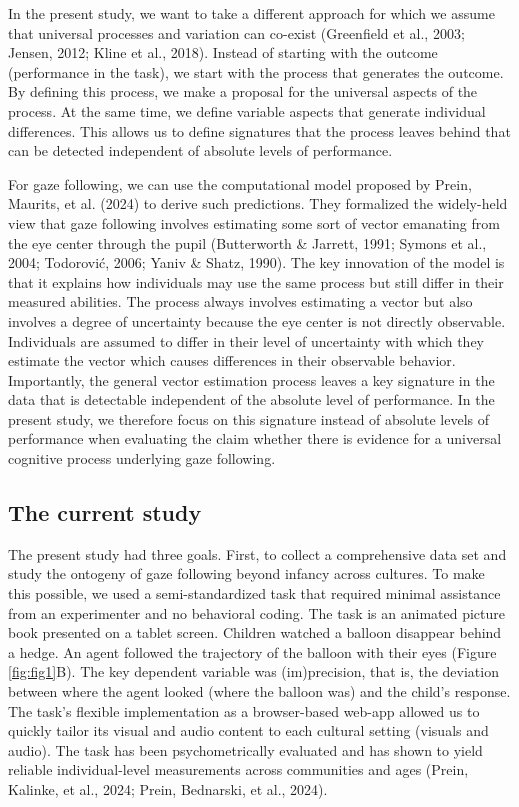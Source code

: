 \documentclass[
  man,floatsintext]{apa7}
\begin{document}
In the present study, we want to take a different approach for which we assume that universal processes and variation can co-exist (Greenfield et al., 2003; Jensen, 2012; Kline et al., 2018). Instead of starting with the outcome (performance in the task), we start with the process that generates the outcome. By defining this process, we make a proposal for the universal aspects of the process. At the same time, we define variable aspects that generate individual differences. This allows us to define signatures that the process leaves behind that can be detected independent of absolute levels of performance.

For gaze following, we can use the computational model proposed by Prein, Maurits, et al. (2024) to derive such predictions. They formalized the widely-held view that gaze following involves estimating some sort of vector emanating from the eye center through the pupil (Butterworth \& Jarrett, 1991; Symons et al., 2004; Todorović, 2006; Yaniv \& Shatz, 1990). The key innovation of the model is that it explains how individuals may use the same process but still differ in their measured abilities. The process always involves estimating a vector but also involves a degree of uncertainty because the eye center is not directly observable. Individuals are assumed to differ in their level of uncertainty with which they estimate the vector which causes differences in their observable behavior. Importantly, the general vector estimation process leaves a key signature in the data that is detectable independent of the absolute level of performance. In the present study, we therefore focus on this signature instead of absolute levels of performance when evaluating the claim whether there is evidence for a universal cognitive process underlying gaze following.

\hypertarget{the-current-study}{%
\subsection{The current study}\label{the-current-study}}

The present study had three goals. First, to collect a comprehensive data set and study the ontogeny of gaze following beyond infancy across cultures. To make this possible, we used a semi-standardized task that required minimal assistance from an experimenter and no behavioral coding. The task is an animated picture book presented on a tablet screen. Children watched a balloon disappear behind a hedge. An agent followed the trajectory of the balloon with their eyes (Figure \ref{fig:fig1}B). The key dependent variable was (im)precision, that is, the deviation between where the agent looked (where the balloon was) and the child's response. The task's flexible implementation as a browser-based web-app allowed us to quickly tailor its visual and audio content to each cultural setting (visuals and audio). The task has been psychometrically evaluated and has shown to yield reliable individual-level measurements across communities and ages (Prein, Kalinke, et al., 2024; Prein, Bednarski, et al., 2024).
\end{document}
